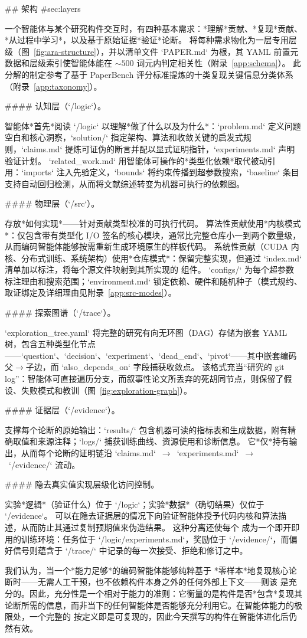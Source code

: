 \begin{markdown}
## \ara{} 架构 {#sec:layers}

一个智能体与某个研究构件交互时，有四种基本需求：*理解*贡献、*复现*贡献、*从过程中学习*，以及基于原始证据*验证*论断。
\ara{} 将每种需求物化为一层专用层级（图~\ref{fig:ara-structure}），并以清单文件 `PAPER.md` 为根，其 YAML 前置元数据和层级索引使智能体能在 ${\sim}500$ 词元内判定相关性（附录~\ref{app:schema}）。
此分解的制定参考了基于 PaperBench 评分标准提炼的十类复现关键信息分类体系（附录~\ref{app:taxonomy}）。

#### 认知层（`/logic`）。

智能体*首先*阅读 `/logic` 以理解*做了什么以及为什么*：`problem.md` 定义问题空白和核心洞察，`solution/` 指定架构、算法和收敛关键的启发式规则，`claims.md` 提炼可证伪的断言并配以显式证明指针，`experiments.md` 声明验证计划。
`related_work.md` 用智能体可操作的*类型化依赖*取代被动引用：`imports` 注入先验定义，`bounds` 将约束传播到超参数搜索，`baseline` 条目支持自动回归检测，从而将文献综述转变为机器可执行的依赖图。

#### 物理层（`/src`）。

存放*如何实现*——针对贡献类型校准的可执行代码。
算法性贡献使用*内核模式*：仅包含带有类型化 I/O 签名的核心模块，通常比完整仓库小一到两个数量级，从而编码智能体能够按需重新生成环境原生的样板代码。
系统性贡献（CUDA 内核、分布式训练、系统架构）使用*仓库模式*：保留完整实现，但通过 `index.md` 清单加以标注，将每个源文件映射到其所实现的 \ara{} 组件。
`configs/` 为每个超参数标注理由和搜索范围；`environment.md` 锁定依赖、硬件和随机种子（模式规约、取证绑定及详细理由见附录~\ref{app:src-modes}）。

#### 探索图谱（`/trace`）。

`exploration_tree.yaml` 将完整的研究有向无环图（DAG）存储为嵌套 YAML 树，包含五种类型化节点——`question`、`decision`、`experiment`、`dead_end`、`pivot`——其中嵌套编码父$\to$子边，而 `also_depends_on` 字段捕获收敛点。
该格式充当“研究的 git log”：智能体可直接遍历分支，而叙事性论文所丢弃的死胡同节点，则保留了假设、失败模式和教训（图~\ref{fig:exploration-graph}）。

#### 证据层（`/evidence`）。

支撑每个论断的原始输出：`results/` 包含机器可读的指标表和生成数据，附有精确取值和来源注释；`logs/` 捕获训练曲线、资源使用和诊断信息。
它*仅*持有输出，从而每个论断的证明链沿 `claims.md`~$\to$~`experiments.md`~$\to$~`/evidence/` 流动。

#### 隐去真实值实现层级化访问控制。

实验*逻辑*（验证什么）位于 `/logic`；实验*数据*（确切结果）仅位于 `/evidence`。
可以在隐去证据层的情况下向验证智能体授予代码内核和算法描述，从而防止其通过复制预期值来伪造结果。
这种分离还使每个 \ara{} 成为一个即开即用的训练环境：任务位于 `/logic/experiments.md`，奖励位于 `/evidence/`，而偏好信号则蕴含于 `/trace/` 中记录的每一次接受、拒绝和修订之中。

我们认为，当一个*能力足够*的编码智能体能够纯粹基于 \ara{} *零样本*地复现核心论断时——无需人工干预，也不依赖构件本身之外的任何外部上下文——则该 \ara{} 是充分的。因此，充分性是一个相对于能力的准则：它衡量的是构件是否*包含*复现其论断所需的信息，而非当下的任何智能体是否能够充分利用它。在智能体能力的极限处，一个完整的 \ara{} 按定义即是可复现的，因此今天撰写的构件在智能体进化后仍然有效。
\end{markdown}
